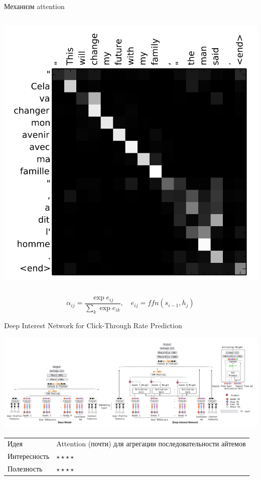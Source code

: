 \documentclass[11pt,aspectratio=169,handout]{beamer}
\begin{document}
\begin{frame}{Механизм attention \cite{NMT}}
\begin{columns}
\begin{column}{0.45\textwidth}
\begin{center}
\includegraphics[scale=0.3]{images/nmt-example.png}
\end{center}
\end{column}
\end{columns}

\vfill
\[
\alpha_{ij} = \frac{\exp e_{ij}}{\sum_k \exp e_{ik}}, \quad e_{ij} = ffn(s_{i-1}, h_j)
\]

\end{frame}

\begin{frame}{Deep Interest Network for Click-Through Rate Prediction \cite{DIN}}

\begin{center}
\includegraphics[scale=0.3]{images/din.png}
\end{center}

\vfill
\begin{small}
\begin{tabular}{l l}
Идея & Attention (почти) для агрегации последовательности айтемов \\
Интересность & $\star\star\star\star$ \\
Полезность & $\star\star\star\star$
\end{tabular}
\end{small}

\end{frame}
\end{document}
